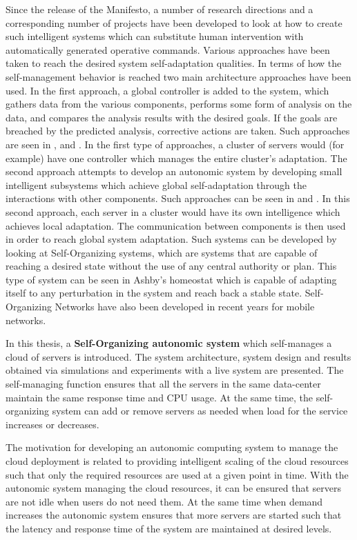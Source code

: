Since the release of the Manifesto, a number of research directions and a corresponding number of projects have been developed to look at how to create such intelligent systems which can substitute human intervention with automatically generated operative commands. Various approaches have been taken to reach the desired system self-adaptation qualities. In terms of how the self-management behavior is reached two main architecture approaches have been used. In the first approach, a global controller is added to the system, which gathers data from the various components, performs some form of analysis on the data, and compares the analysis results with the desired goals. If the goals are breached by the predicted analysis, corrective actions are taken. Such approaches are seen in \cite{related:architecture:hierarch1}, \cite{related:model:lqm} and \cite{bogdan:seams07}. In the first type of approaches, a cluster of servers would (for example) have one controller which manages the entire cluster's adaptation. The second approach attempts to develop an autonomic system by developing small intelligent subsystems which achieve global self-adaptation through the interactions with other components. Such approaches can be seen in \cite{related:architecture:selflet} and \cite{related:architecture:unity}. In this second approach, each server in a cluster would have its own intelligence which achieves local adaptation. The communication between components is then used in order to reach global system adaptation. Such systems can be developed by looking at Self-Organizing systems, which are systems that are capable of reaching a desired state without the use of any central authority or plan. This type of system can be seen in Ashby's homeostat \cite{ashby:homeostat} which is capable of adapting itself to any perturbation in the system and reach back a stable state. Self-Organizing Networks have also been developed in recent years for mobile networks.

In this thesis, a \textbf{Self-Organizing autonomic system} which self-manages a cloud of servers is introduced. The system architecture, system design and results obtained via simulations and experiments with a live system are presented. The self-managing function ensures that all the servers in the same data-center maintain the same response time and CPU usage. At the same time, the self-organizing system can add or remove servers as needed when load for the service increases or decreases.

The motivation for developing an autonomic computing system to manage the cloud deployment is related to providing intelligent scaling of the cloud resources such that only the required resources are used at a given point in time. With the autonomic system managing the cloud resources, it can be ensured that servers are not idle when users do not need them. At the same time when demand increases the autonomic system ensures that more servers are started such that the latency and response time of the system are maintained at desired levels.

